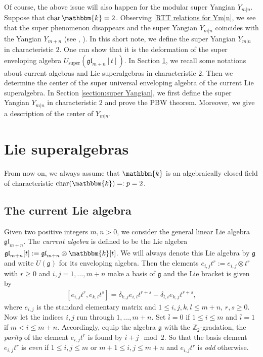 \documentclass[12pt,reqno]{amsart}
\newcommand{\ZZ}{\mathbb{Z}}
\newcommand{\fg}{\mathfrak{g}}
\newcommand{\fgl}{\mathfrak{gl}}
\newcommand{\kk}{\mathbbm{k}}
\newcommand{\gl}{\mathfrak{gl}}
\DeclareMathOperator{\super}{super}
\DeclareMathOperator{\Char}{char}
\numberwithin{equation}{section}
\theoremstyle{Theorem}
\theoremstyle{remark}
\numberwithin{equation}{section}
\begin{document}
Of course, 
the above issue will also happen for the modular super Yangian $Y_{m|n}$.
Suppose that $\Char\kk=2$.
Observing \eqref{RTT relations for Ym|n},
we see that the super phenomenon disappears and the super Yangian $Y_{m|n}$ coincides with the Yangian $Y_{m+n}$ (see \cite{CH23}, \cite{Hu25}).
In this short note, we define the super Yangian $Y_{m|n}$ in characteristic $2$.
One can show that it is the deformation of the super enveloping algebra
$U_{\super}(\fgl_{m+n}[t])$.
In Section \ref{Section:Lie super}, 
we recall some notations about current algebras
and Lie superalgebras in characteristic $2$.
Then we determine the center of the super universal enveloping algebra of the current Lie superalgebra.
In Section \ref{section:super Yangian},
we first define the super Yangian $Y_{m|n}$ in characteristic $2$ and prove the PBW theorem.
Moreover, we give a description of the center of $Y_{m|n}$.
\section{Lie superalgebras}\label{Section:Lie super}
From now on,
we always assume that $\kk$ is an algebraically closed field of characteristic $\Char(\kk)=:p=2$.
\subsection{The current Lie algebra}
Given two positive integers $m,n>0$,
we consider the general linear Lie algebra $\gl_{m+n}$.
The {\it current algebra} is defined to be the Lie algebra $\gl_{m+n}[t]:=\gl_{m+n}\otimes \kk[t]$.
We will always denote this Lie algebra by $\fg$ and write $U(\fg)$ for its enveloping algebra.
Then the elements $e_{i,j}t^r:=e_{i,j}\otimes t^r$ with $r\geq 0$ and $i,j=1,\dots,m+n$
make a basis of $\fg$ and the Lie bracket is given by
\begin{align}\label{lie bracket of g}
[e_{i,j}t^r,e_{k,l}t^s]=\delta_{k,j}e_{i,l}t^{r+s}-\delta_{l,i}e_{k,j}t^{r+s},
\end{align}
where $e_{i,j}$ is the standard elementary matrix and
$1\leq i,j,k,l\leq m+n$,
$r,s\geq 0$.
Now let the indices $i,j$ run through $1,\dots,m+n$.
Set $\bar i=0$ if $1\leq i\leq m$ and $\bar i=1$ if $m<i\leq m+n$. 
Accordingly, equip the algebra $\fg$ with the $\ZZ_2$-gradation,
the {\it parity} of the element $e_{i,j}t^r$ is found by $\bar i+\bar j\mod 2$.
So that the basis element $e_{i,j}t^r$ is {\it even} if $1\leq i,j\leq m$ or $m+1\leq i,j\leq m+n$ and $e_{i,j}t^r$ is {\it odd} otherwise.
\end{document}
